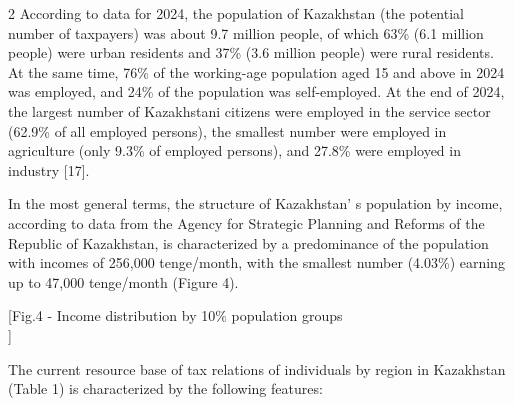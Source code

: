 \begin{multicols}{2}
According to data for 2024, the population of Kazakhstan (the potential
number of taxpayers) was about 9.7 million people, of which 63\% (6.1
million people) were urban residents and 37\% (3.6 million people) were
rural residents. At the same time, 76\% of the working-age population
aged 15 and above in 2024 was employed, and 24\% of the population was
self-employed. At the end of 2024, the largest number of Kazakhstani
citizens were employed in the service sector (62.9\% of all employed
persons), the smallest number were employed in agriculture (only 9.3\%
of employed persons), and 27.8\% were employed in industry {[}17{]}.

In the most general terms, the structure of Kazakhstan' s
population by income, according to data from the Agency for Strategic
Planning and Reforms of the Republic of Kazakhstan, is characterized by
a predominance of the population with incomes of 256,000 tenge/month,
with the smallest number (4.03\%) earning up to 47,000 tenge/month
(Figure 4).
\end{multicols}

[Fig.4 - Income distribution by 10\% population
groups\\]

The current resource base of tax relations of individuals by region in
Kazakhstan (Table 1) is characterized by the following features:

